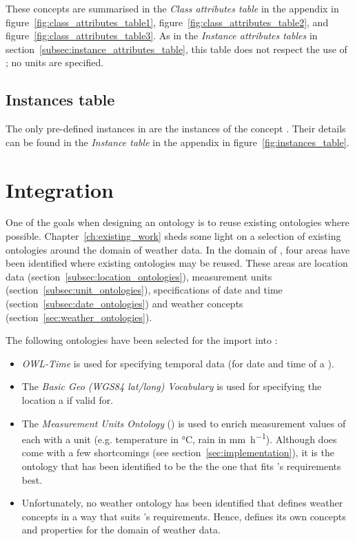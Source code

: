 These concepts are summarised in the \emph{Class attributes table} in the appendix in figure~\ref{fig:class_attributes_table1}, figure~\ref{fig:class_attributes_table2}, and figure~\ref{fig:class_attributes_table3}. As in the \emph{Instance attributes tables} in section~\ref{subsec:instance_attributes_table}, this table does not respect the use of \muo; no units are specified.

\subsection{Instances table}
\label{subsec:instances_table}

The only pre-defined instances in \smarthomeweather are the instances of the concept . Their details can be found in the \emph{Instance table} in the appendix in figure~\ref{fig:instances_table}.

\section{Integration}
\label{sec:integration}

One of the goals when designing an ontology is to reuse existing ontologies where possible\cite{reuse1,reuse2}. Chapter~\ref{ch:existing_work} sheds some light on a selection of existing ontologies around the domain of weather data. In the domain of \smarthomeweather, four areas have been identified where existing ontologies may be reused. These areas are location data (section~\ref{subsec:location_ontologies}), measurement units (section~\ref{subsec:unit_ontologies}), specifications of date and time (section~\ref{subsec:date_ontologies}) and weather concepts (section~\ref{sec:weather_ontologies}).

The following ontologies have been selected for the import into \smarthomeweather:
\begin{itemize}
  \item \emph{OWL-Time}\cite{owl-time} is used for specifying temporal data (for date and time of a ).
  \item The \emph{Basic Geo (WGS84 lat/long) Vocabulary}\cite{wgs84_vocabulary} is used for specifying the location a  if valid for.
  \item The \emph{Measurement Units Ontology}\cite{MUO} (\muo) is used to enrich measurement values of each  with a unit (e.g. temperature in \si{\celsius}, rain in \si{\milli\metre\per\hour}). Although \muo does come with a few shortcomings (see section~\ref{sec:implementation}), it is the ontology that has been identified to be the the one that fits \smarthomeweather's requirements best.
  \item Unfortunately, no weather ontology has been identified that defines weather concepts in a way that suits \smarthomeweather's requirements. Hence, \smarthomeweather defines its own concepts and properties for the domain of weather data.
\end{itemize}

